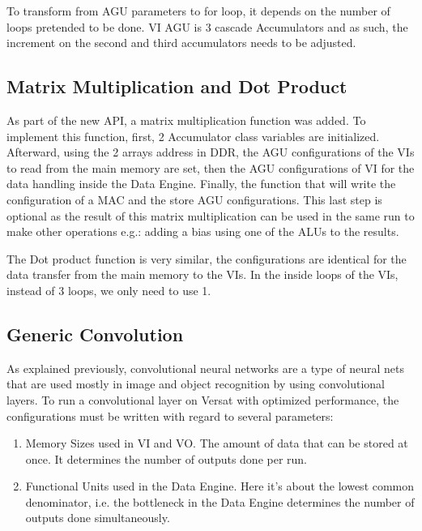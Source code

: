 \documentclass[conference]{IEEEtran}
\begin{document}
To transform from AGU parameters to for loop, it depends on the number of loops pretended to be done. VI AGU is 3 cascade Accumulators
and as such, the increment on the second and third accumulators needs to be adjusted.

% 

\subsection{Matrix Multiplication and Dot Product}

As part of the new API, a matrix multiplication function was added. To implement this function, first, 2 Accumulator class variables are initialized.
Afterward, using the 2 arrays address in DDR, the AGU configurations of the VIs to read from the main memory are set, then the AGU configurations of VI for the data handling inside the Data Engine.
Finally, the function that will write the configuration of a MAC and the store AGU configurations. This last step is optional as the result of this matrix multiplication can be used in the same run
to make other operations e.g.: adding a bias using one of the ALUs to the results.

% 

The Dot product function is very similar, the configurations are identical for the data transfer from the main memory to the VIs. In the inside loops of the VIs, instead of 3 loops, we only need to use 
1.

\subsection{Generic Convolution}

As explained previously, convolutional neural networks are a type of neural nets that are 
used mostly in image and object recognition by using convolutional layers. To run a convolutional layer on Versat with
optimized performance, the configurations must be written with regard to several parameters:

\begin{enumerate}
	\item Memory Sizes used in VI and VO. The amount of data that can be stored at once. It determines the number of outputs done per run.
	\item Functional Units used in the Data Engine. Here it's about the lowest common denominator, i.e. the bottleneck in the Data Engine determines the number of outputs done simultaneously.
  \end{enumerate}
 
\end{document}
